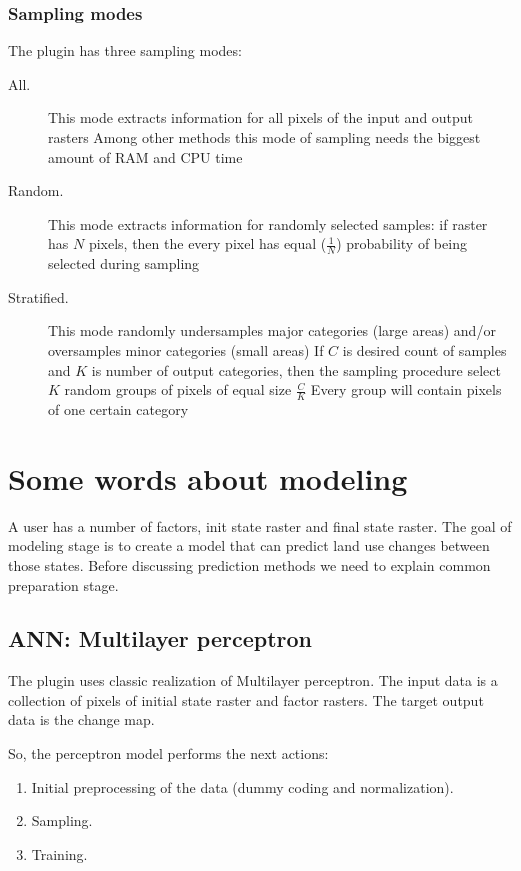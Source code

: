 \documentclass{report}
\begin{document}
\subsubsection{Sampling modes}\label{subsec:sampling_modes}
The plugin has three sampling modes:
\begin{description}
    \item[All.] This mode extracts information for all pixels of the input and output rasters Among other methods this mode of sampling needs the biggest amount of RAM and CPU time
    \item[Random.] This mode extracts information for randomly selected samples: if raster has $N$ pixels, then the every pixel has equal ($\frac1N$) probability of being selected during sampling
    \item[Stratified.] This mode randomly undersamples major categories (large areas) and/or oversamples minor categories (small areas) If $C$ is desired count of samples and $K$ is number of output categories, then the sampling procedure select $K$ random groups of pixels of equal size $\frac{C}{K}$ Every group will contain pixels of one certain category
\end{description}

\section{Some words about modeling}\label{sec:modeling}

A user has a number of factors, init state raster and final state raster.
The goal of modeling stage is to create a model that can predict land use changes between those states. Before discussing prediction methods we need to explain common preparation stage.

\subsection{ANN: Multilayer perceptron}\label{subsec:ANN}

The plugin uses classic realization of Multilayer perceptron. The input data is a collection of pixels of initial state raster and factor rasters. The target output data is the change map.

So, the perceptron model performs the next actions:
\begin{enumerate}
    \item Initial preprocessing of the data (dummy coding and normalization).
    \item Sampling.
    \item Training.
\end{enumerate}
\end{document}
